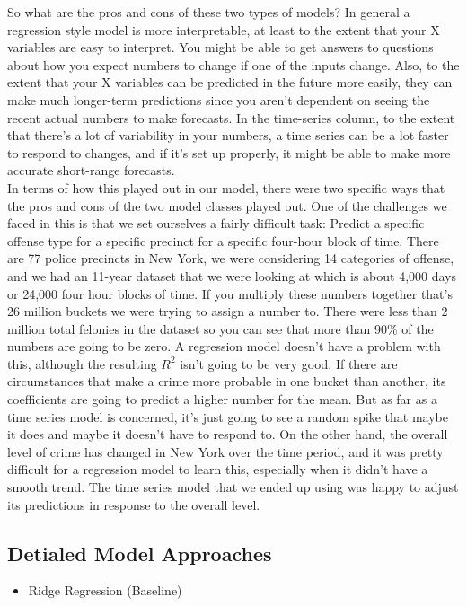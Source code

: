 \documentclass[10pt,journal,compsoc]{IEEEtran}
\begin{document}
So what are the pros and cons of these two types of models? In general a regression style model is more interpretable, at least to the extent that your X variables are easy to interpret. You might be able to get answers to questions about how you expect numbers to change if one of the inputs change. Also, to the extent that your X variables can be predicted in the future more easily, they can make much longer-term predictions since you aren't dependent on seeing the recent actual numbers to make forecasts. In the time-series column, to the extent that there's a lot of variability in your numbers, a time series can be a lot faster to respond to changes, and if it's set up properly, it might be able to make more accurate short-range forecasts. \\

In terms of how this played out in our model, there were two specific ways that the pros and cons of the two model classes played out. One of the challenges we faced in this is that we set ourselves a fairly difficult task: Predict a specific offense type for a specific precinct for a specific four-hour block of time. There are 77 police precincts in New York, we were considering 14 categories of offense, and we had an 11-year dataset that we were looking at which is about 4,000 days or 24,000 four hour blocks of time. If you multiply these numbers together that's 26 million buckets we were trying to assign a number to. There were less than 2 million total felonies in the dataset so you can see that more than 90\% of the numbers are going to be zero. A regression model doesn't have a problem with this, although the resulting $R^2$ isn't going to be very good. If there are circumstances that make a crime more probable in one bucket than another, its coefficients are going to predict a higher number for the mean. But as far as a time series model is concerned, it's just going to see a random spike that maybe it does and maybe it doesn't have to respond to. On the other hand, the overall level of crime has changed in New York over the time period, and it was pretty difficult for a regression model to learn this, especially when it didn't have a smooth trend. The time series model that we ended up using was happy to adjust its predictions in response to the overall level.\\

\subsection{Detialed Model Approaches}
\begin{itemize}
  \item Ridge Regression (Baseline)
\end{itemize}
\end{document}
